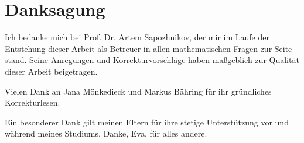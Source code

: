 \chapter*{Danksagung}
Ich bedanke mich bei Prof. Dr. Artem Sapozhnikov,
der mir im Laufe der {Entstehung} dieser Arbeit als Betreuer in allen mathematischen Fragen zur Seite stand.
Seine Anregungen und Korrekturvorschläge haben maßgeblich zur Qualität dieser Arbeit beigetragen.

Vielen Dank an Jana Mönkedieck und Markus Bähring für ihr gründliches Korrekturlesen.

Ein besonderer Dank gilt meinen Eltern für ihre stetige Unterstützung vor und während meines Studiums.
Danke, Eva, für alles andere.